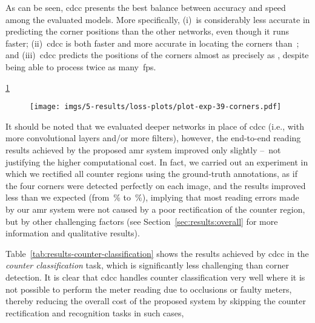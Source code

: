 As can be seen, \gls*{cdcc} presents the best balance between accuracy and speed among the evaluated models.
More specifically, (i)~\smallerlocatenet is considerably less accurate in predicting the corner positions than the other networks, even though it runs faster; (ii)~\gls*{cdcc} is both faster and more accurate in locating the corners than~\locatenet; and
(iii)~\gls*{cdcc} predicts the positions of the corners almost as precisely as \yoohybrid, despite being able to process twice as many~\gls*{fps}. 

\ref{fig:cdcc-net-loss-plot}


\begin{figure}[!htb]
    \centering
    \texttt{[image: imgs/5-results/loss-plots/plot-exp-39-corners.pdf]}
    
    \vspace{-4mm}
    
    \caption{\small {}}
    \label{fig:cdcc-net-loss-plot}
\end{figure}

It should be noted that we evaluated deeper networks in place of \gls*{cdcc} (i.e., with more convolutional layers and/or more filters), however, the end-to-end reading results achieved by the proposed \gls*{amr} system improved only slightly --~not justifying the higher computational cost.
In fact, we carried out an experiment in which we rectified all counter regions using the ground-truth annotations, as if the four corners were detected perfectly on each image, and the results improved less than we expected (from~\% to~\%), implying that most reading errors made by our \gls*{amr} system were not caused by a poor rectification of the counter region, but by other challenging factors (see Section~\ref{sec:results:overall} for more information and qualitative results). 

Table~\ref{tab:results-counter-classification} shows the results achieved by \gls*{cdcc} in the \textit{counter classification} task, which is significantly less challenging than corner detection.
It is clear that \gls*{cdcc} handles counter classification very well  where it is not possible to perform the meter reading due to occlusions or faulty meters, thereby reducing the overall cost of the proposed system by skipping the counter rectification and recognition tasks in such cases, 



